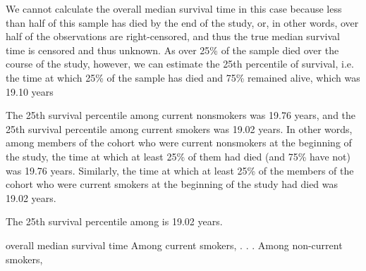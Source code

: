 \documentclass{article}\usepackage[]{graphicx}\usepackage[]{color}
\begin{document}
\fi

We cannot calculate the overall median survival time in this case because less than half of this sample has died by the end of the study, or, in other words, over half of the observations are right-censored, and thus the true median survival time is censored and thus unknown.  As over 25\% of the sample died over the course of the study, however, we can estimate the 25th percentile of survival, i.e. the time at which 25\% of the sample has died and 75\% remained alive, which was 19.10 years

The 25th survival percentile among current nonsmokers was 19.76 years, and the 25th survival percentile among current smokers was 19.02 years.  In other words, among members of the cohort who were current nonsmokers at the beginning of the study, the time at which at least 25\% of them had died (and 75\% have not) was 19.76 years.  Similarly, the time at which at least 25\% of the members of the cohort who were current smokers at the beginning of the study had died was 19.02 years.


The 25th survival percentile among  is 19.02 years.

overall median survival time Among current smokers, . . . Among non-current smokers, 
\end{document}
